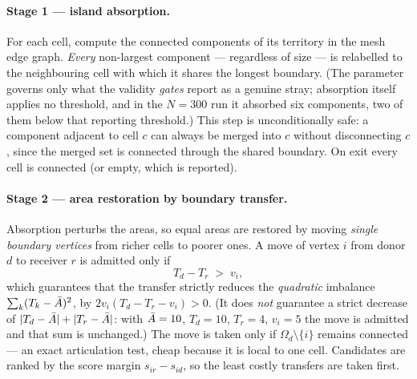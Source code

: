 \documentclass[11pt,a4paper]{article}
\begin{document}
\paragraph{Stage 1 --- island absorption.} For each cell, compute the connected
components of its territory in the mesh edge graph. \emph{Every} non-largest
component --- regardless of size --- is relabelled to the neighbouring cell with
which it shares the longest boundary. (The 
parameter governs only what the validity \emph{gates} report as a genuine stray;
absorption itself applies no threshold, and in the $N=300$ run it absorbed six
components, two of them below that reporting threshold.) This step is unconditionally safe:
a component adjacent to cell $c$ can always be merged into $c$ without
disconnecting $c$, since the merged set is connected through the shared boundary.
On exit every cell is connected (or empty, which is reported).

\paragraph{Stage 2 --- area restoration by boundary transfer.} Absorption
perturbs the areas, so equal areas are restored by moving \emph{single boundary
vertices} from richer cells to poorer ones. A move of vertex $i$ from donor $d$ to
receiver $r$ is admitted only if
\begin{equation}
  T_d - T_r \;>\; v_i ,
  \label{eq:improving}
\end{equation}
which guarantees that the transfer strictly reduces the \emph{quadratic}
imbalance $\sum_k (T_k - \bar{A})^2$, by $2 v_i (T_d - T_r - v_i) > 0$. (It does
\emph{not} guarantee a strict decrease of $|T_d - \bar{A}| + |T_r - \bar{A}|$: with
$\bar{A} = 10$, $T_d = 10$, $T_r = 4$, $v_i = 5$ the move is admitted and that sum
is unchanged.) The move is taken only if $\Omega_d \setminus \{i\}$ remains connected
--- an exact articulation test, cheap because it is local to one cell. Candidates
are ranked by the score margin $s_{ir} - s_{id}$, so the least costly transfers
are taken first.
\end{document}

